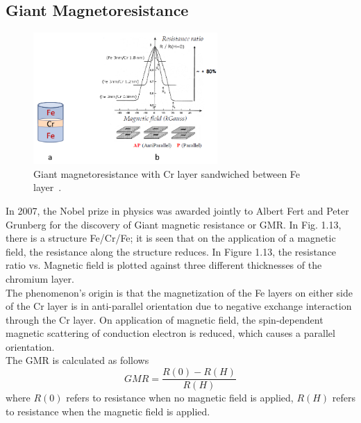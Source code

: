 \documentclass[12pt,a4paper,bold]{thesis}
\theoremstyle{thm}
\theoremstyle{definition}
\begin{document}
\subsection{Giant Magnetoresistance}
\begin{figure}[H]
	\centering
   \includegraphics[height=5cm]{Images/25.png} 
   \caption{Giant magnetoresistance with Cr layer sandwiched between Fe layer~\cite{baibich1988giant, binasch1989enhanced}.}
\end{figure}
\indent \indent\indent In 2007, the Nobel prize in physics was awarded jointly to Albert Fert and Peter Grunberg for the discovery of Giant magnetic resistance or GMR. In Fig. 1.13, there is a structure Fe/Cr/Fe; it is seen that on the application of a magnetic field, the resistance along the structure reduces. In Figure 1.13, the resistance ratio vs. Magnetic field is plotted against three different thicknesses of the chromium layer.~\cite{baibich1988giant, binasch1989enhanced}\\
\indent \indent The phenomenon's origin is that the magnetization of the Fe layers on either side of the Cr layer is in anti-parallel orientation due to negative exchange interaction through the Cr layer. On application of magnetic field, the spin-dependent magnetic scattering of conduction electron is reduced, which causes a parallel orientation.\\
The GMR is calculated as follows
\[GMR=\frac{R(0)-R(H)}{R(H)}\]
where $R(0)$ refers to resistance when no magnetic field is applied, $R(H)$ refers to resistance when the magnetic field is applied.
\end{document}
